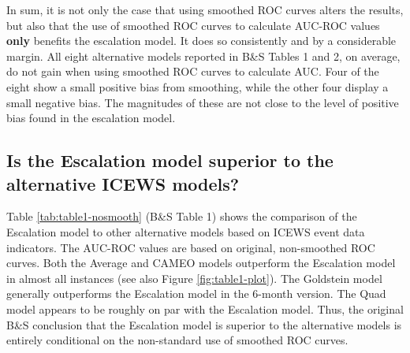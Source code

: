 \documentclass[
]{article}
\begin{document}
In sum, it is not only the case that using smoothed ROC curves alters the results, but also that the use of smoothed ROC curves to calculate AUC-ROC values \textbf{only} benefits the escalation model. It does so consistently and by a considerable margin. All eight alternative models reported in B\&S Tables 1 and 2, on average, do not gain when using smoothed ROC curves to calculate AUC. Four of the eight show a small positive bias from smoothing, while the other four display a small negative bias. The magnitudes of these are not close to the level of positive bias found in the escalation model.

\hypertarget{is-the-escalation-model-superior-to-the-alternative-icews-models}{%
\subsection{Is the Escalation model superior to the alternative ICEWS models?}\label{is-the-escalation-model-superior-to-the-alternative-icews-models}}

Table \ref{tab:table1-nosmooth} (B\&S Table 1) shows the comparison of the Escalation model to other alternative models based on ICEWS event data indicators. The AUC-ROC values are based on original, non-smoothed ROC curves. Both the Average and CAMEO models outperform the Escalation model in almost all instances (see also Figure \ref{fig:table1-plot}). The Goldstein model generally outperforms the Escalation model in the 6-month version. The Quad model appears to be roughly on par with the Escalation model. Thus, the original B\&S conclusion that the Escalation model is superior to the alternative models is entirely conditional on the non-standard use of smoothed ROC curves.
\end{document}

